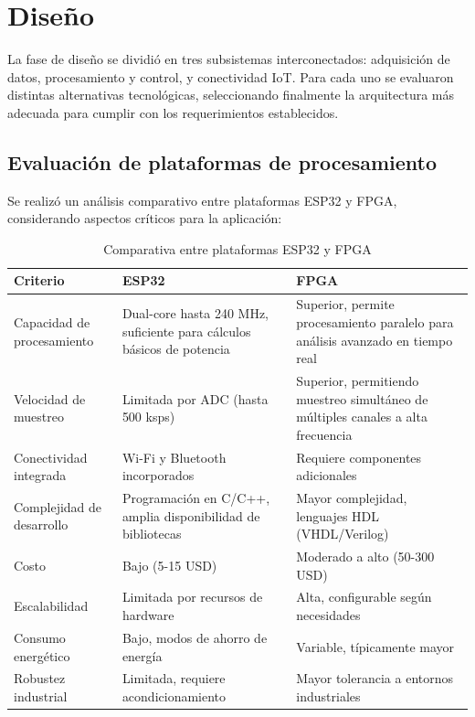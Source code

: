 \documentclass{report}          %
\begin{document}
        \section{Diseño}
            La fase de diseño se dividió en tres subsistemas interconectados: adquisición de datos, procesamiento y control, y conectividad IoT. Para cada uno se evaluaron distintas alternativas tecnológicas, seleccionando finalmente la arquitectura más adecuada para cumplir con los requerimientos establecidos.
        
            \subsection{Evaluación de plataformas de procesamiento}
                Se realizó un análisis comparativo entre plataformas ESP32 y FPGA, considerando aspectos críticos para la aplicación:
        
                \begin{table}[H]
                    \centering
                    \begin{tabular}{|p{3cm}|p{5cm}|p{5cm}|}
                        \hline
                        \textbf{Criterio} & \textbf{ESP32} & \textbf{FPGA} \\
                        \hline
                        Capacidad de procesamiento & Dual-core hasta 240 MHz, suficiente para cálculos básicos de potencia & Superior, permite procesamiento paralelo para análisis avanzado en tiempo real \\
                        \hline
                        Velocidad de muestreo & Limitada por ADC (hasta 500 ksps) & Superior, permitiendo muestreo simultáneo de múltiples canales a alta frecuencia \\
                        \hline
                        Conectividad integrada & Wi-Fi y Bluetooth incorporados & Requiere componentes adicionales \\
                        \hline
                        Complejidad de desarrollo & Programación en C/C++, amplia disponibilidad de bibliotecas & Mayor complejidad, lenguajes HDL (VHDL/Verilog) \\
                        \hline
                        Costo & Bajo (5-15 USD) & Moderado a alto (50-300 USD) \\
                        \hline
                        Escalabilidad & Limitada por recursos de hardware & Alta, configurable según necesidades \\
                        \hline
                        Consumo energético & Bajo, modos de ahorro de energía & Variable, típicamente mayor \\
                        \hline
                        Robustez industrial & Limitada, requiere acondicionamiento & Mayor tolerancia a entornos industriales \\
                        \hline
                    \end{tabular}
                    \caption{Comparativa entre plataformas ESP32 y FPGA}
                \end{table}
        
\end{document}

